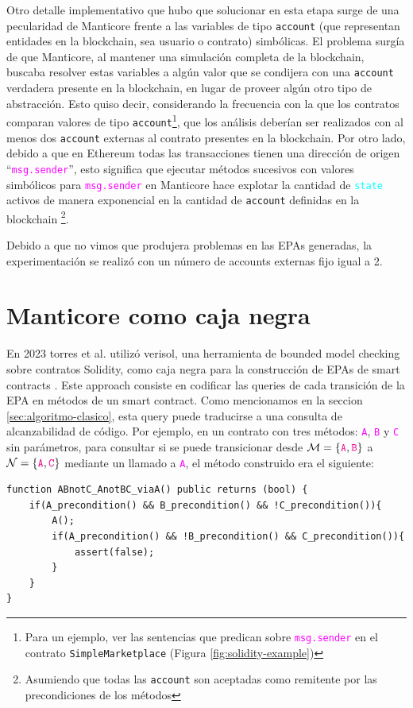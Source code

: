 Otro detalle implementativo que hubo que solucionar en esta etapa surge de una pecularidad de Manticore frente a las variables de tipo \texttt{account} (que representan entidades en la blockchain, sea usuario o contrato) simbólicas.
El problema surgía de que Manticore, al mantener una simulación completa de la blockchain, buscaba resolver estas variables a algún valor que se condijera con una \texttt{account} verdadera presente en la blockchain, en lugar de proveer algún otro tipo de abstracción.
Esto quiso decir, considerando la frecuencia con la que los contratos comparan valores de tipo \texttt{account}\footnote{Para un ejemplo, ver las sentencias que predican sobre \textcolor{magenta}{\texttt{msg.sender}} en el contrato \texttt{SimpleMarketplace} (Figura \ref{fig:solidity-example})}, que los análisis deberían ser realizados con al menos dos \texttt{account} externas al contrato presentes en la blockchain.
Por otro lado, debido a que en Ethereum todas las transacciones tienen una dirección de origen ``\textcolor{magenta}{\texttt{msg.sender}}'', esto significa que ejecutar métodos sucesivos con valores simbólicos para \textcolor{magenta}{\texttt{msg.sender}} en Manticore hace explotar la cantidad de \textcolor{cyan}{\texttt{state}} activos de manera exponencial en la cantidad de \texttt{account} definidas en la blockchain \footnote{Asumiendo que todas las \texttt{account} son aceptadas como remitente por las precondiciones de los métodos}.

Debido a que no vimos que produjera problemas en las EPAs generadas, la experimentación se realizó con un número de accounts externas fijo igual a 2.

\section{Manticore como caja negra}
En 2023 torres et al. utilizó verisol, una herramienta de bounded model checking sobre contratos Solidity, como caja negra para la construcción de EPAs de smart contracts \cite{torres} \cite{verisol}.
Este approach consiste en codificar las queries de cada transición de la EPA en métodos de un smart contract.
Como mencionamos en la seccion \ref{sec:algoritmo-clasico}, esta query puede traducirse a una consulta de alcanzabilidad de código.
Por ejemplo, en un contrato con tres métodos: \textcolor{magenta}{\texttt{A}}, \textcolor{magenta}{\texttt{B}} y \textcolor{magenta}{\texttt{C}} sin parámetros, para consultar si se puede transicionar desde $\mathcal{M}=\{\textcolor{magenta}{\texttt{A}}, \textcolor{magenta}{\texttt{B}}\}$ a $\mathcal{N} = \{\textcolor{magenta}{\texttt{A}}, \textcolor{magenta}{\texttt{C}}\}$ mediante un llamado a \textcolor{magenta}{\texttt{A}}, el método construido era el siguiente:
\begin{lstlisting}[language=Solidity]
function ABnotC_AnotBC_viaA() public returns (bool) {
    if(A_precondition() && B_precondition() && !C_precondition()){
        A();
        if(A_precondition() && !B_precondition() && C_precondition()){
            assert(false);
        }
    }
}
\end{lstlisting}

